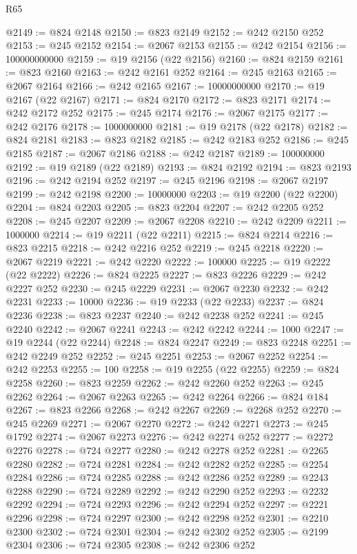 \begin{lexlean}{R65}
\begin{coremodule}
{@2149 := @824 @2148
@2150 := @823 @2149
@2152 := @242 @2150 @252
@2153 := @245 @2152
@2154 := @2067 @2153
@2155 := @242 @2154
@2156 := 100000000000
@2159 := @19 @2156 (@22 @2156)
@2160 := @824 @2159
@2161 := @823 @2160
@2163 := @242 @2161 @252
@2164 := @245 @2163
@2165 := @2067 @2164
@2166 := @242 @2165
@2167 := 10000000000
@2170 := @19 @2167 (@22 @2167)
@2171 := @824 @2170
@2172 := @823 @2171
@2174 := @242 @2172 @252
@2175 := @245 @2174
@2176 := @2067 @2175
@2177 := @242 @2176
@2178 := 1000000000
@2181 := @19 @2178 (@22 @2178)
@2182 := @824 @2181
@2183 := @823 @2182
@2185 := @242 @2183 @252
@2186 := @245 @2185
@2187 := @2067 @2186
@2188 := @242 @2187
@2189 := 100000000
@2192 := @19 @2189 (@22 @2189)
@2193 := @824 @2192
@2194 := @823 @2193
@2196 := @242 @2194 @252
@2197 := @245 @2196
@2198 := @2067 @2197
@2199 := @242 @2198
@2200 := 10000000
@2203 := @19 @2200 (@22 @2200)
@2204 := @824 @2203
@2205 := @823 @2204
@2207 := @242 @2205 @252
@2208 := @245 @2207
@2209 := @2067 @2208
@2210 := @242 @2209
@2211 := 1000000
@2214 := @19 @2211 (@22 @2211)
@2215 := @824 @2214
@2216 := @823 @2215
@2218 := @242 @2216 @252
@2219 := @245 @2218
@2220 := @2067 @2219
@2221 := @242 @2220
@2222 := 100000
@2225 := @19 @2222 (@22 @2222)
@2226 := @824 @2225
@2227 := @823 @2226
@2229 := @242 @2227 @252
@2230 := @245 @2229
@2231 := @2067 @2230
@2232 := @242 @2231
@2233 := 10000
@2236 := @19 @2233 (@22 @2233)
@2237 := @824 @2236
@2238 := @823 @2237
@2240 := @242 @2238 @252
@2241 := @245 @2240
@2242 := @2067 @2241
@2243 := @242 @2242
@2244 := 1000
@2247 := @19 @2244 (@22 @2244)
@2248 := @824 @2247
@2249 := @823 @2248
@2251 := @242 @2249 @252
@2252 := @245 @2251
@2253 := @2067 @2252
@2254 := @242 @2253
@2255 := 100
@2258 := @19 @2255 (@22 @2255)
@2259 := @824 @2258
@2260 := @823 @2259
@2262 := @242 @2260 @252
@2263 := @245 @2262
@2264 := @2067 @2263
@2265 := @242 @2264
@2266 := @824 @184
@2267 := @823 @2266
@2268 := @242 @2267
@2269 := @2268 @252
@2270 := @245 @2269
@2271 := @2067 @2270
@2272 := @242 @2271
@2273 := @245 @1792
@2274 := @2067 @2273
@2276 := @242 @2274 @252
@2277 := @2272 @2276
@2278 := @724 @2277
@2280 := @242 @2278 @252
@2281 := @2265 @2280
@2282 := @724 @2281
@2284 := @242 @2282 @252
@2285 := @2254 @2284
@2286 := @724 @2285
@2288 := @242 @2286 @252
@2289 := @2243 @2288
@2290 := @724 @2289
@2292 := @242 @2290 @252
@2293 := @2232 @2292
@2294 := @724 @2293
@2296 := @242 @2294 @252
@2297 := @2221 @2296
@2298 := @724 @2297
@2300 := @242 @2298 @252
@2301 := @2210 @2300
@2302 := @724 @2301
@2304 := @242 @2302 @252
@2305 := @2199 @2304
@2306 := @724 @2305
@2308 := @242 @2306 @252
}
\end{coremodule}
\end{lexlean}
